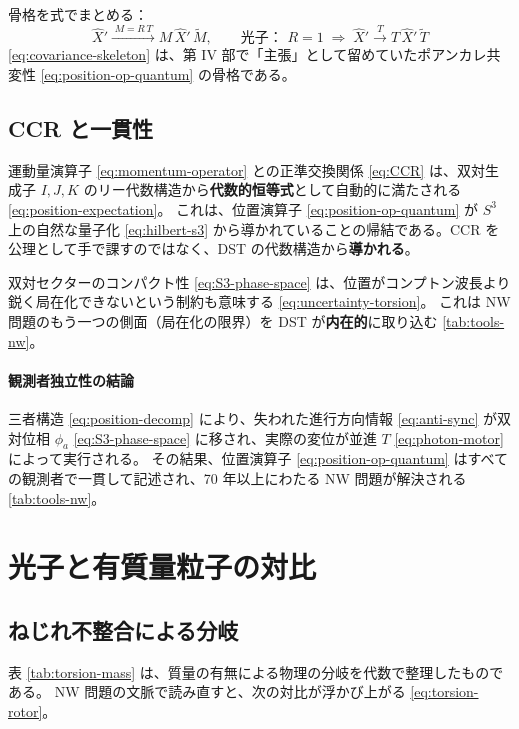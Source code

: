 \documentclass[dvipdfmx,a4paper,oneside]{jsbook}
\numberwithin{equation}{chapter}
\begin{document}
骨格を式でまとめる：
\begin{equation}
  \boxed{\;
  \hat{X}' \xrightarrow{\;M = R\,T\;}
  M\,\hat{X}'\,\widetilde{M},
  \qquad
  \text{光子： } R = 1 \;\Rightarrow\; \hat{X}' \xrightarrow{\;T\;} T\,\hat{X}'\,\widetilde{T}
  \;}
  \label{eq:covariance-skeleton}
\end{equation}
\eqref{eq:covariance-skeleton} は、第 IV 部で「主張」として留めていたポアンカレ共変性 \eqref{eq:position-op-quantum} の骨格である。

\subsection{CCR と一貫性}

運動量演算子 \eqref{eq:momentum-operator} との正準交換関係 \eqref{eq:CCR} は、双対生成子 \(I, J, K\) のリー代数構造から\textbf{代数的恒等式}として自動的に満たされる \eqref{eq:position-expectation}。
これは、位置演算子 \eqref{eq:position-op-quantum} が \(S^3\) 上の自然な量子化 \eqref{eq:hilbert-s3} から導かれていることの帰結である。CCR を公理として手で課すのではなく、DST の代数構造から\textbf{導かれる}。

双対セクターのコンパクト性 \eqref{eq:S3-phase-space} は、位置がコンプトン波長より鋭く局在化できないという制約も意味する \eqref{eq:uncertainty-torsion}。
これは NW 問題のもう一つの側面（局在化の限界）を DST が\textbf{内在的}に取り込む \eqref{tab:tools-nw}。

\paragraph{観測者独立性の結論}
三者構造 \eqref{eq:position-decomp} により、失われた進行方向情報 \eqref{eq:anti-sync} が双対位相 \(\phi_a\) \eqref{eq:S3-phase-space} に移され、実際の変位が並進 \(T\) \eqref{eq:photon-motor} によって実行される。
その結果、位置演算子 \eqref{eq:position-op-quantum} はすべての観測者で一貫して記述され、70 年以上にわたる NW 問題が解決される \eqref{tab:tools-nw}。

\section{光子と有質量粒子の対比}

\subsection{ねじれ不整合による分岐}

表 \ref{tab:torsion-mass} は、質量の有無による物理の分岐を代数で整理したものである。
NW 問題の文脈で読み直すと、次の対比が浮かび上がる \eqref{eq:torsion-rotor}。
\end{document}
